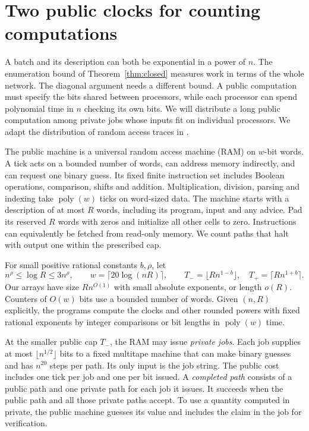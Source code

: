 \section{Two public clocks for counting computations}\label{sec:gap}

A batch and its description can both be exponential in a power of $n$.
The enumeration bound of Theorem~\ref{thm:closed} measures work in
terms of the whole network. The diagonal argument needs a different
bound. A public computation must specify the bits shared between
processors, while each processor can spend polynomial time in $n$
checking its own bits. We will distribute a long public computation
among private jobs whose inputs fit on individual processors.
We adapt the distribution of random access traces in
\cite[Section~]{oaG}.

The public machine is a universal random access machine (RAM) on
$w$-bit words. A tick acts on a bounded number of words, can address
memory indirectly, and can request one binary guess. Its fixed finite
instruction set includes Boolean operations, comparison, shifts and
addition. Multiplication, division, parsing and indexing take
$\operatorname{poly}(w)$ ticks on word-sized data. The machine starts
with a description of at most $R$ words, including its program, input
and any advice. Pad its reserved $R$ words with zeros and initialize
all other cells to zero. Instructions can equivalently
be fetched from read-only memory. We count paths that halt with output
one within the prescribed cap.

For small positive rational constants $b,\rho$, let
\[
    n^\rho\le \log R\le 3n^\rho,\qquad
    w=\lceil 20\log(nR)\rceil,\qquad
    T_-=\lfloor R n^{1-b}\rfloor,\quad
    T_+=\lceil R n^{1+b}\rceil .
\]
Our arrays have size $R n^{O(1)}$ with small absolute exponents, or
length $o(R)$. Counters of $O(w)$ bits use a bounded number of words.
Given $(n,R)$ explicitly, the programs compute the clocks and other
rounded powers with fixed rational exponents by integer comparisons or
bit lengths in $\operatorname{poly}(w)$ time.

At the smaller public cap $T_-$, the RAM may issue \emph{private jobs}.
Each job supplies at most $\lfloor n^{1/2}\rfloor$ bits to a fixed
multitape machine that can make binary guesses and has $n^{20}$ steps
per path. Its only input is the job string. The public cost includes one
tick per job and one per bit issued. A \emph{completed path} consists
of a public path and one private path for each job it issues. It
succeeds when the public path and all those private paths accept.
To use a quantity computed in private, the public machine guesses
its value and includes the claim in the job for verification.

